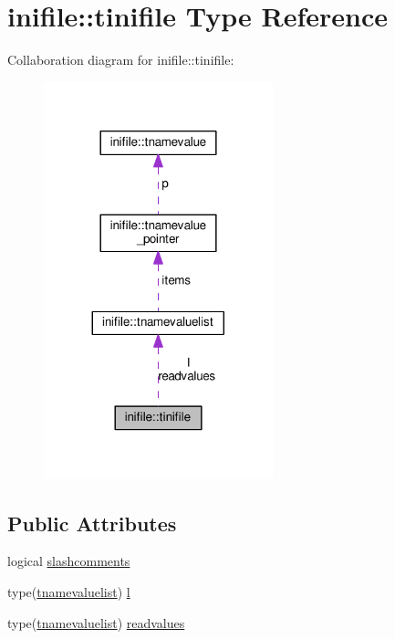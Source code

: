 \hypertarget{structinifile_1_1tinifile}{}\section{inifile\+:\+:tinifile Type Reference}
\label{structinifile_1_1tinifile}


Collaboration diagram for inifile\+:\+:tinifile\+:
\nopagebreak
\begin{figure}[H]
\begin{center}
\leavevmode
\includegraphics[width=188pt]{structinifile_1_1tinifile__coll__graph}
\end{center}
\end{figure}
\subsection*{Public Attributes}
\begin{DoxyCompactItemize}
\item 
logical \mbox{\hyperlink{structinifile_1_1tinifile_a303b7538da0462447581053359bc665c}{slashcomments}}
\item 
type(\mbox{\hyperlink{structinifile_1_1tnamevaluelist}{tnamevaluelist}}) \mbox{\hyperlink{structinifile_1_1tinifile_a13fecceab48fd32cc17872911f17b400}{l}}
\item 
type(\mbox{\hyperlink{structinifile_1_1tnamevaluelist}{tnamevaluelist}}) \mbox{\hyperlink{structinifile_1_1tinifile_abcc7f492a814c91e3a3b7b1f0fc4f4f1}{readvalues}}
\end{DoxyCompactItemize}



